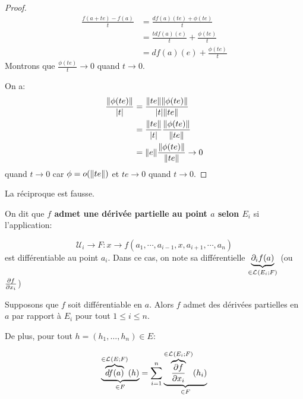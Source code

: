 \ifdefined\outputproof
\begin{proof}
\begin{align}
	\displaystyle \frac{f(a + te) - f(a)}{t}
	&= \frac{df(a)(te) + \phi(te)}{t}\\
	&= \frac{t df(a)(e)}{t} + \frac{\phi(te)}{t} \\
	&= df(a)(e) + \frac{\phi(te)}{t}
\end{align}
	Montrons que $\displaystyle \frac{\phi(te)}{t} \rightarrow 0$ quand $t
	\rightarrow 0$.

	On a:
	\begin{align*}
		\frac{\norm{\phi(te)}}{|t|}
		& = \frac{\norm{te} \norm{\phi(te)}}{\abs{t} \norm{te}} \\
		& = \frac{\norm{te}}{\abs{t}} \frac{\norm{\phi(te)}}{\norm{te}} \\
		& = \norm{e} \frac{\norm{\phi(te)}}{\norm{te}} \rightarrow 0
	\end{align*}
	quand $t \rightarrow 0$ car $\phi = o(\norm{te})$ et $te \rightarrow 0$
	quand $t \rightarrow 0$.
\end{proof}
\fi

\begin{remarque}
	La réciproque est fausse.
\end{remarque}

\begin{definition}
	\label{definition:partial_application}
	On dit que \textbf{$f$ admet une dérivée partielle au point $a$ selon
		$E_{i}$} si l'application:

	\begin{equation*}
		\mathcal{U}_{i} \rightarrow F : x \rightarrow f(a_{1}, \cdots, a_{i -
		1}, x, a_{i + 1}, \cdots, a_{n})
	\end{equation*}
	est différentiable au point $a_{i}$. Dans ce cas, on note sa différentielle
	$\underbrace{\partial_{i} f(a)}_{\in \mathcal{L}_{}(E_{i}; F)}$ (ou
	$\pdv{f}{x_{i}} (a)$)
\end{definition}

\begin{proposition}
	Supposons que $f$ soit différentiable en $a$. Alors $f$ admet des dérivées
	partielles en $a$ par rapport à $E_{i}$ pour tout $1 \leq i \leq n$.

	De plus, pour tout $h = (h_{1}, \ldots, h_{n}) \in E$:

	\begin{equation*}
		\underbrace{\overbrace{df(a)}^{\in \mathcal{L}_{}(E; F)}(h)}_{\in F} =
		\displaystyle \sum_{i = 1}^{n} \underbrace{\overbrace{\pdv{f}{x_{i}} (a)}^{\in
			\mathcal{L}_{}(E_{i}; F)} (h_{i})}_{\in F}
	\end{equation*}
\end{proposition}

